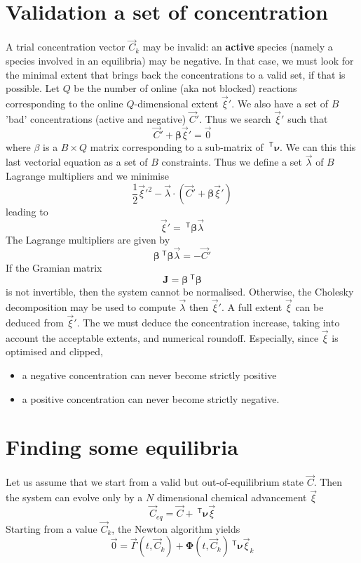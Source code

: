 \documentclass[aps]{revtex4}
\newcommand{\mymat}[1]{\bm{#1}}
\newcommand{\mytrn}[1]{~^{\mathsf{T}}{#1}}
\begin{document}
\section{Validation a set of concentration}
A trial concentration vector $\vec{C}_k$ may be invalid: an \textbf{active} species (namely a species involved in an equilibria)
may be negative. In that case, we must look for the minimal extent that brings back the concentrations to a valid set, if that
is possible.
Let $Q$ be the number of online (aka not blocked) reactions corresponding 
to the online $Q$-dimensional extent $\vec{\xi}'$. We also have a set of $B$ 'bad' concentrations (active and negative) $\vec{C}'$.
Thus we search $\vec{\xi}'$ such that
$$
	\vec{C}' + \mymat{\beta} \vec{\xi}' = \vec{0}
$$
where $\beta$ is a $B\times Q$ matrix corresponding to a sub-matrix of $\mytrn{\mymat{\nu}}$.
We can this this last vectorial equation as a set of $B$ constraints. Thus we define a set
$\vec{\lambda}$ of $B$ Lagrange multipliers and we minimise
$$
	\dfrac{1}{2} \vec{\xi}'^2 - \vec{\lambda}\cdot\left(\vec{C}' + \mymat{\beta} \vec{\xi}'\right)
$$
leading to
$$
	\vec{\xi}' = \mytrn{\mymat{\beta}}\vec{\lambda}
$$
The Lagrange multipliers are given by
$$
	\mymat{\beta}\mytrn{\mymat{\beta}} \vec{\lambda} = -\vec{C}'
$$
If the Gramian matrix 
$$
	\mymat{J} = \mymat{\beta}\mytrn{\mymat{\beta}}
$$	
is not invertible, then the system cannot be normalised.
Otherwise, the Cholesky decomposition may be used to compute $\vec{\lambda}$ then 
$\vec{\xi}'$.
A full extent $\vec{\xi}$ can be deduced from $\vec{\xi}'$.
The we must deduce the concentration increase, taking into account the acceptable extents,
and numerical roundoff.
Especially, since $\vec{\xi}$ is optimised and clipped,
\begin{itemize}
\item a negative concentration can never become strictly positive
\item a positive concentration can never become strictly negative.
\end{itemize}
                 

\section{Finding some equilibria}

Let us assume that we start from a valid but out-of-equilibrium state $\vec{C}$.
Then the system can evolve only by a $N$ dimensional chemical advancement $\vec{\xi}$
\begin{equation}
	\vec{C}_{eq} = \vec{C} + \mytrn{\mymat{\nu}}\vec{\xi}
\end{equation}
Starting from a value $\vec{C}_{k}$, the Newton algorithm yields
\begin{equation}
	\vec{0} = \vec{\Gamma}(t,\vec{C}_k) + \mymat{\Phi}(t,\vec{C}_k) \mytrn{\mymat{\nu}}\vec{\xi}_k
\end{equation}
\end{document}
